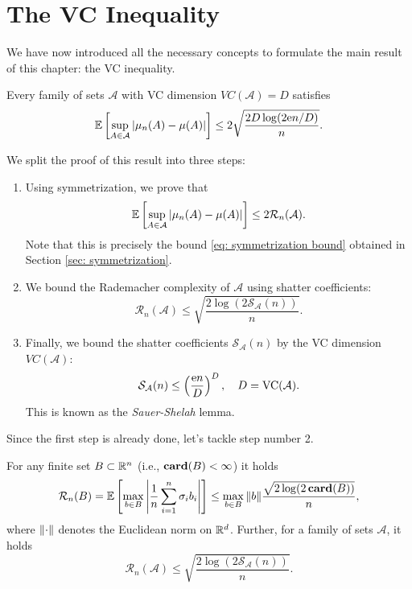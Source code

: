 \section{The VC Inequality}
\label{sec: VC inequality}

We have now introduced all the necessary concepts to formulate the main result of this chapter: the VC inequality.

\begin{theorem}[VC Inequality]
Every family of sets $\mathcal{A}$ with VC dimension $VC(\mathcal{A}) = D$ satisfies
\[
    \mathbb{E}\left[ \sup_{A \in \mathcal{A}} \abs{\mu_n(A) - \mu(A)} \right] \leq 2 \sqrt{\frac{2D \log(2 \mathrm{e} n / D)}{n}}.
\]
\end{theorem}

We split the proof of this result into three steps:

\begin{enumerate}
    \item Using symmetrization, we prove that
    \[
        \mathbb{E}\left[ \sup_{A \in \mathcal{A}} \abs{\mu_n(A) - \mu(A)} \right] \leq 2 \mathcal{R}_n(\mathcal{A}).
    \]
    Note that this is precisely the bound \eqref{eq: symmetrization bound} obtained in Section \ref{sec: symmetrization}.

    \item We bound the Rademacher complexity of $\mathcal{A}$ using shatter coefficients:
    \[
        \mathcal{R}_n(\mathcal{A}) \leq \sqrt{ \frac{2 \log(2 \mathcal{S}_{\mathcal{A}}(n)) }{n} }.
    \]

    \item Finally, we bound the shatter coefficients $\mathcal{S}_{\mathcal{A}}(n)$ by the VC dimension $VC(\mathcal{A})$:
    \[
        \mathcal{S}_{\mathcal{A}}(n) \leq \left( \frac{\mathrm{e} n}{D} \right)^D, \quad D = \mathrm{VC}(\mathcal{A}).
    \]
    This is known as the \emph{Sauer-Shelah} lemma.
\end{enumerate}

Since the first step is already done, let's tackle step number 2.

\begin{lemma}
For any finite set $B \subset \mathbb{R}^n$ (i.e., $\mathrm{\mathbf{card}}(B) < \infty$) it holds
\[
    \mathcal{R}_n(B) = \mathbb{E}\left[\max_{b \in B} \abs{ \frac{1}{n} \sum_{i=1}^n \sigma_i b_i}\right] \leq \max_{b \in B} \norm{b} \frac{\sqrt{2 \log(2 \, \mathrm{\mathbf{card}}(B))}}{n},
\]
where $\norm{\cdot}$ denotes the Euclidean norm on $\mathbb{R}^d$. Further, for a family of sets $\mathcal{A}$, it holds
\[
    \mathcal{R}_n(\mathcal{A}) \leq \sqrt{ \frac{2 \log(2 \mathcal{S}_{\mathcal{A}}(n)) }{n} }.
\]
\end{lemma}

